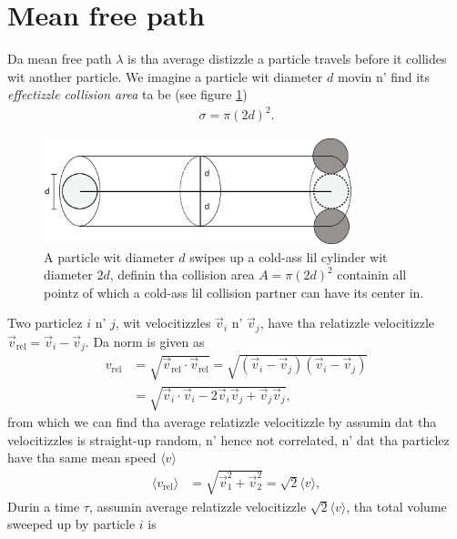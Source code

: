 \section{Mean free path}
\label{sec:mean_free_path_calculation}
Da mean free path $\lambda$ is tha average distizzle a particle travels before it collides wit another particle. We imagine a particle wit diameter $d$ movin n' find its \textit{effectizzle collision area} ta be (see figure \ref{fig:effective_collision_area})
\begin{align}
	\sigma = \pi (2d)^2.
\end{align}
\begin{figure}[h]
\begin{center}
\includegraphics[width=0.8\textwidth, trim=0cm 0cm 0cm 0cm, clip]{DSMC/figures/effective_area2.eps}
\end{center}
\caption{A particle wit diameter $d$ swipes up a cold-ass lil cylinder wit diameter $2d$, definin tha collision area $A=\pi (2d)^2$ containin all pointz of which a cold-ass lil collision partner can have its center in.}
\label{fig:effective_collision_area}
\end{figure}
Two particlez $i$ n' $j$, wit velocitizzles $\vec v_i$ n' $\vec v_j$, have tha relatizzle velocitizzle $\vec v_\text{rel} = \vec v_i - \vec v_j$. Da norm is given as
\begin{align}
	v_\text{rel} &= \sqrt{\vec v_\text{rel}\cdot \vec v_\text{rel} } = \sqrt{ (\vec v_i - \vec v_j)(\vec v_i - \vec v_j)}\\
	&= \sqrt{\vec v_i\cdot \vec v_i - 2\vec v_i\vec v_j + \vec v_j\vec v_j},
\end{align}
from which we can find tha average relatizzle velocitizzle by assumin dat tha velocitizzles is straight-up random, n' hence not correlated, n' dat tha particlez have tha same mean speed $\langle v\rangle$
\begin{align}
	\langle v_\text{rel}\rangle &= \sqrt{\vec v_1^2 + \vec v_2^2} = \sqrt 2 \langle v\rangle,
\end{align}
Durin a time $\tau$, assumin average relatizzle velocitizzle $\sqrt 2 \langle v\rangle$, tha total volume sweeped up by particle $i$ is 
